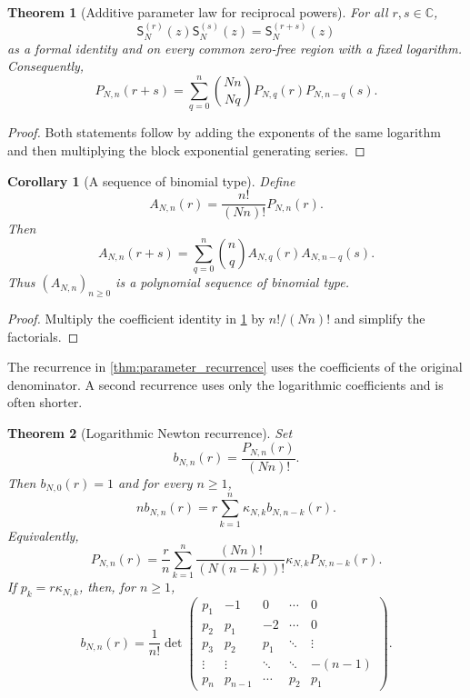 \documentclass[11pt,letterpaper]{article}
\newtheorem{theorem}{Theorem}[section]
\newtheorem{corollary}[corollary]{Corollary}
\theoremstyle{definition}
\theoremstyle{remark}
\newcommand{\CC}{\mathbb C}
\newcommand{\Sfun}{\mathsf S}
\begin{document}
\begin{theorem}[Additive parameter law for reciprocal powers]\label{thm:reciprocal_parameter_addition}
For all $r,s\in\CC$,
\[
\Sfun_N^{(r)}(z)\Sfun_N^{(s)}(z)
=
\Sfun_N^{(r+s)}(z)
\]
as a formal identity and on every common zero-free region with a fixed logarithm.  Consequently,
\[
P_{N,n}(r+s)
=
\sum_{q=0}^{n}
\binom{Nn}{Nq}
P_{N,q}(r)P_{N,n-q}(s).
\]
\end{theorem}

\begin{proof}
Both statements follow by adding the exponents of the same logarithm and then multiplying the block exponential generating series.
\end{proof}

\begin{corollary}[A sequence of binomial type]\label{cor:binomial_type}
Define
\[
A_{N,n}(r)
=
\frac{n!}{(Nn)!}P_{N,n}(r).
\]
Then
\[
A_{N,n}(r+s)
=
\sum_{q=0}^{n}
\binom nq
A_{N,q}(r)A_{N,n-q}(s).
\]
Thus $(A_{N,n})_{n\geq0}$ is a polynomial sequence of binomial type.
\end{corollary}

\begin{proof}
Multiply the coefficient identity in \cref{thm:reciprocal_parameter_addition} by $n!/(Nn)!$ and simplify the factorials.
\end{proof}


The recurrence in \cref{thm:parameter_recurrence} uses the coefficients of the original denominator.  A second recurrence uses only the logarithmic coefficients and is often shorter.

\begin{theorem}[Logarithmic Newton recurrence]\label{thm:logarithmic_newton_recurrence}
Set
\[
b_{N,n}(r)=\frac{P_{N,n}(r)}{(Nn)!}.
\]
Then $b_{N,0}(r)=1$ and
for every $n\geq1$,
\[
nb_{N,n}(r)
=
r\sum_{k=1}^{n}\kappa_{N,k}b_{N,n-k}(r).
\]
Equivalently,
\[
P_{N,n}(r)
=
\frac r n
\sum_{k=1}^{n}
\frac{(Nn)!}{(N(n-k))!}
\kappa_{N,k}P_{N,n-k}(r).
\]
If $p_k=r\kappa_{N,k}$, then, for $n\geq1$,
\[
b_{N,n}(r)
=
\frac1{n!}
\det
\begin{pmatrix}
p_1&-1&0&\cdots&0\\
p_2&p_1&-2&\cdots&0\\
p_3&p_2&p_1&\ddots&\vdots\\
\vdots&\vdots&\ddots&\ddots&-(n-1)\\
p_n&p_{n-1}&\cdots&p_2&p_1
\end{pmatrix}.
\]
\end{theorem}
\end{document}
